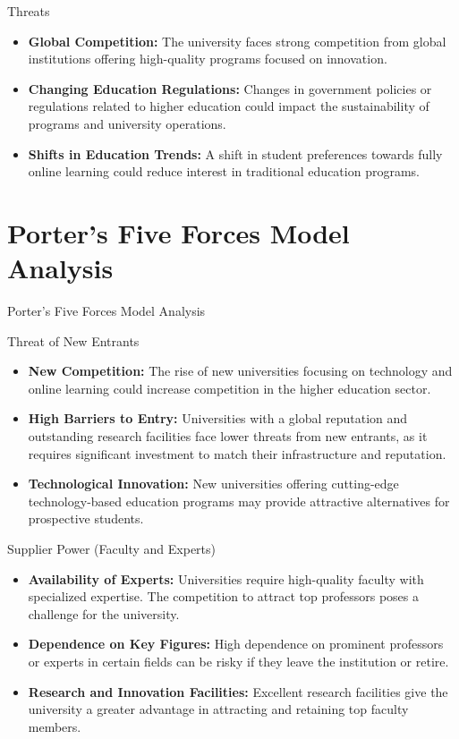 \documentclass[aspectratio=169, table]{beamer}
\begin{document}
\begin{frame}{Threats}
	\begin{itemize}
		\item \textbf{Global Competition:} The university faces strong competition from global institutions offering high-quality programs focused on innovation.
		\item \textbf{Changing Education Regulations:} Changes in government policies or regulations related to higher education could impact the sustainability of programs and university operations.
		\item \textbf{Shifts in Education Trends:} A shift in student preferences towards fully online learning could reduce interest in traditional education programs.
	\end{itemize}
\end{frame}

\section{Porter's Five Forces Model Analysis}

\begin{frame}
	\centering
	\Huge Porter's Five Forces Model Analysis
\end{frame}

\begin{frame}{Threat of New Entrants}
	\begin{itemize}
		\item \textbf{New Competition:} The rise of new universities focusing on technology and online learning could increase competition in the higher education sector.
		\item \textbf{High Barriers to Entry:} Universities with a global reputation and outstanding research facilities face lower threats from new entrants, as it requires significant investment to match their infrastructure and reputation.
		\item \textbf{Technological Innovation:} New universities offering cutting-edge technology-based education programs may provide attractive alternatives for prospective students.
	\end{itemize}
\end{frame}

\begin{frame}{Supplier Power (Faculty and Experts)}
	\begin{itemize}
		\item \textbf{Availability of Experts:} Universities require high-quality faculty with specialized expertise. The competition to attract top professors poses a challenge for the university.
		\item \textbf{Dependence on Key Figures:} High dependence on prominent professors or experts in certain fields can be risky if they leave the institution or retire.
		\item \textbf{Research and Innovation Facilities:} Excellent research facilities give the university a greater advantage in attracting and retaining top faculty members.
	\end{itemize}
\end{frame}
\end{document}
